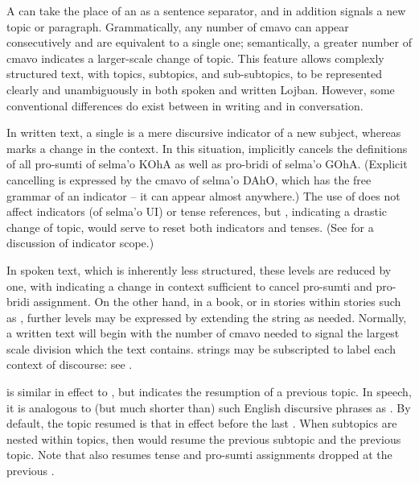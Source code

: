 A  can take the place of an  as a sentence
    separator, and in addition signals a new topic or paragraph.
    Grammatically, any number of  cmavo can appear
    consecutively and are equivalent to a single one; semantically,
    a greater number of  cmavo indicates a larger-scale
    change of topic. This feature allows complexly structured text,
    with topics, subtopics, and sub-subtopics, to be represented
    clearly and unambiguously in both spoken and written Lojban.
    However, some conventional differences do exist between
     in writing and in conversation.

In written text, a single  is a mere discursive
    indicator of a new subject, whereas  marks a change
    in the context. In this situation,  implicitly
    cancels the definitions of all pro-sumti of selma'o KOhA as
    well as pro-bridi of selma'o GOhA. (Explicit cancelling is
    expressed by the cmavo  of selma'o DAhO, which has the
    free grammar of an indicator -- it can appear almost anywhere.)
    The use of  does not affect indicators (of selma'o
    UI) or tense references, but , indicating a
    drastic change of topic, would serve to reset both indicators
    and tenses. (See  for a discussion
    of indicator scope.)

In spoken text, which is inherently less structured, these
    levels are reduced by one, with  indicating a change in
    context sufficient to cancel pro-sumti and pro-bridi
    assignment. On the other hand, in a book, or in stories within
    stories such as , further levels may be
    expressed by extending the  string as needed. Normally,
    a written text will begin with the number of  cmavo
    needed to signal the largest scale division which the text
    contains.  strings may be subscripted to label each
    context of discourse: see .

 is similar in effect to , but indicates the
    resumption of a previous topic. In speech, it is analogous to
    (but much shorter than) such English discursive phrases as
    . By default, the topic
    resumed is that in effect before the last . When
    subtopics are nested within topics, then  would resume
    the previous subtopic and  the previous topic. Note
    that  also resumes tense and pro-sumti assignments
    dropped at the previous .

